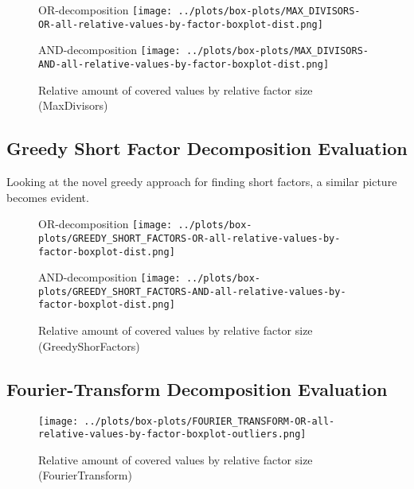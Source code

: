 \begin{figure}[t]
	\begin{minipage}[h]{0.49\linewidth}
		\centering
		OR-decomposition
		\texttt{[image: ../plots/box-plots/MAX\_DIVISORS-OR-all-relative-values-by-factor-boxplot-dist.png]}
	\end{minipage}
	\begin{minipage}[h]{0.49\linewidth}
		\centering
		AND-decomposition
		\texttt{[image: ../plots/box-plots/MAX\_DIVISORS-AND-all-relative-values-by-factor-boxplot-dist.png]}
	\end{minipage}
	\caption{Relative amount of covered values by relative factor size (MaxDivisors)}
	\label{fig:max-divisor-all-factors-box-plot}
\end{figure}

\subsection{Greedy Short Factor Decomposition Evaluation}
Looking at the novel greedy approach for finding short factors, a similar picture becomes evident.

\begin{figure}[b]
	\begin{minipage}[h]{0.49\linewidth}
		\centering
		OR-decomposition
		\texttt{[image: ../plots/box-plots/GREEDY\_SHORT\_FACTORS-OR-all-relative-values-by-factor-boxplot-dist.png]}
	\end{minipage}
	\begin{minipage}[h]{0.49\linewidth}
		\centering
		AND-decomposition
		\texttt{[image: ../plots/box-plots/GREEDY\_SHORT\_FACTORS-AND-all-relative-values-by-factor-boxplot-dist.png]}
	\end{minipage}
	\caption{Relative amount of covered values by relative factor size (GreedyShorFactors)}
	\label{fig:greedy-short-factors-all-factors-box-plot}
\end{figure}

\subsection{Fourier-Transform Decomposition Evaluation}

\begin{figure}[h]
	\texttt{[image: ../plots/box-plots/FOURIER\_TRANSFORM-OR-all-relative-values-by-factor-boxplot-outliers.png]}
	\caption{Relative amount of covered values by relative factor size (FourierTransform)}
	\label{fig:fourier-all-factors-box-plot}
\end{figure}

